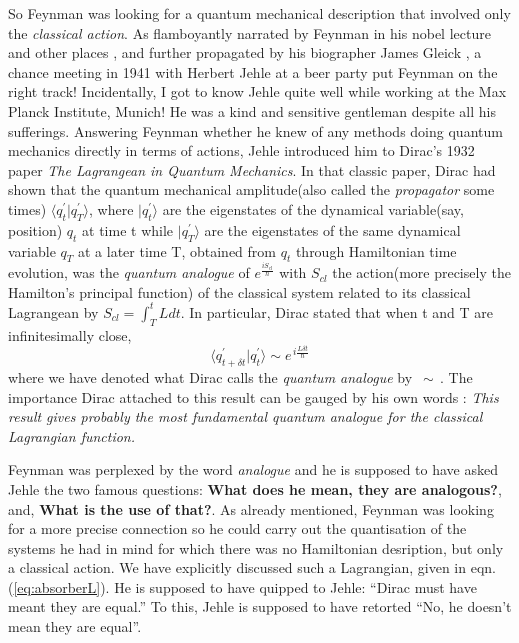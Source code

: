 \documentclass[12pt]{article}
\newcommand{\be}{\begin{equation}}
\newcommand{\ee}{\end{equation}}
\begin{document}
So Feynman was looking for a quantum mechanical description that involved only the {\it classical action}. As flamboyantly narrated by 
Feynman in his nobel lecture \cite{nobel} and other places \cite{joking}, and further propagated by his biographer
James Gleick \cite{gleick}, a chance meeting in 1941 with Herbert Jehle at a beer party put Feynman on the right track! Incidentally, 
I got to know Jehle quite well while working at the Max Planck Institute, Munich! He was a kind and sensitive gentleman despite all his 
sufferings. Answering Feynman whether he knew of any methods doing quantum mechanics directly in terms of actions, Jehle introduced him to 
Dirac's 1932 paper {\it The Lagrangean in Quantum Mechanics}\cite{diracpaper}. In that classic paper, Dirac had shown that the
quantum mechanical amplitude(also called the {\it propagator} some times) $ \langle q^\prime_t|q^\prime_T\rangle $,
where $|q^\prime_t\rangle$ are the eigenstates of the dynamical variable(say, position) $q_t$ at time t while $|q^\prime_T\rangle$
are the eigenstates of the same dynamical variable $q_T$ at a later time T, obtained from $q_t$ through Hamiltonian time evolution, was
the {\it quantum analogue} of $ e^{\frac{iS_{cl}}{\hbar}} $ with $S_{cl}$ the action(more precisely the Hamilton's principal function) of the 
classical system related to its classical Lagrangean by $ S_{cl} = \int_T^{t}L dt $. In particular, Dirac stated that when t and T are 
infinitesimally close,
\be
\label{eq:qanalogue}
\langle q^\prime_{t+\delta t}|q^\prime_t\rangle \sim  e^{\,i \frac {L \delta t}{\hbar}}
\ee
where we have denoted what Dirac calls the {\it quantum analogue} by $\,\sim\,$. The importance Dirac attached to this result can be gauged
by his own words \cite{diracbook2}: {\it This result gives probably the most fundamental quantum analogue for the classical Lagrangian 
function.}

Feynman was perplexed by the word {\it analogue} and he is supposed to have asked Jehle the two famous questions:
{\bf What does he mean, they are analogous?}, and, {\bf What is the use of that?}. As already mentioned,
Feynman was looking for a more precise connection so he could carry out the quantisation of the systems he had in mind for which
there was no Hamiltonian desription, but only a classical action. We have explicitly discussed such a Lagrangian, given in 
eqn.(\ref{eq:absorberL}). He is supposed to have quipped to Jehle: ``Dirac must have meant they are
equal.'' To this, Jehle is supposed to have retorted ``No, he doesn't mean they are equal''.  
\end{document}
